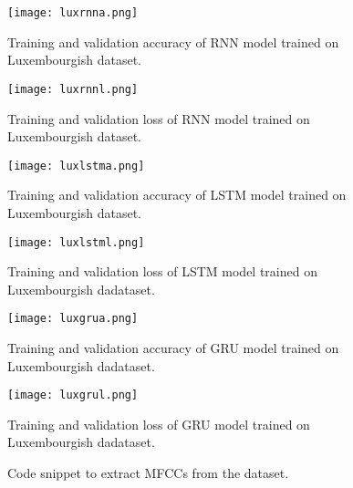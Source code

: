 \begin{figure}[h]
  \centering
  \texttt{[image: luxrnna.png]}
  \caption{Training and validation accuracy of RNN model trained on
  Luxembourgish dataset.}
  \label{luxrnna}
\end{figure}

\begin{figure}[h]
  \centering
  \texttt{[image: luxrnnl.png]}
  \caption{Training and validation loss of RNN model trained on Luxembourgish
  dataset.}
  \label{luxrnnl}
\end{figure}

\begin{figure}[h]
  \centering
  \texttt{[image: luxlstma.png]}
  \caption{Training and validation accuracy of LSTM model trained on
  Luxembourgish dataset.}
  \label{luxlstma}
\end{figure}

\begin{figure}[h]
  \centering
  \texttt{[image: luxlstml.png]}
  \caption{Training and validation loss of LSTM model trained on Luxembourgish
  dadataset.}
  \label{luxlstml}
\end{figure}

\begin{figure}[h]
  \centering
  \texttt{[image: luxgrua.png]}
  \caption{Training and validation accuracy of GRU model trained on Luxembourgish
  dadataset.}
  \label{luxgrua}
\end{figure}

\begin{figure}[h]
  \centering
  \texttt{[image: luxgrul.png]}
  \caption{Training and validation loss of GRU model trained on Luxembourgish
  dadataset.}
  \label{luxgrul}
\end{figure}

\begin{figure}[h]
  \centering
  
  \caption{Code snippet to extract MFCCs from the dataset.}
  \label{mfccsnip}
\end{figure}
